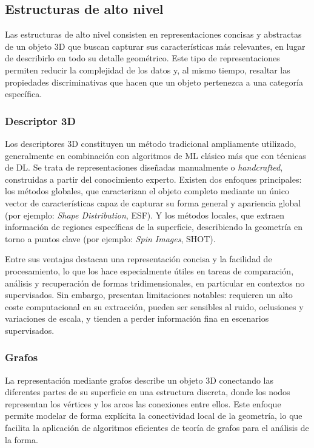 \subsection{Estructuras de alto nivel}
Las estructuras de alto nivel consisten en representaciones concisas y abstractas de un objeto 3D que buscan capturar sus características más relevantes, en lugar de describirlo en todo su detalle geométrico. Este tipo de representaciones permiten reducir la complejidad de los datos y, al mismo tiempo, resaltar las propiedades discriminativas que hacen que un objeto pertenezca a una categoría específica.

\subsubsection{Descriptor 3D}
Los descriptores 3D constituyen un método tradicional ampliamente utilizado, generalmente en combinación con algoritmos de ML clásico más que con técnicas de DL. Se trata de representaciones diseñadas manualmente o \textit{handcrafted}, construidas a partir del conocimiento experto. Existen dos enfoques principales: los métodos globales, que caracterizan el objeto completo mediante un único vector de características capaz de capturar su forma general y apariencia global (por ejemplo: \textit{Shape Distribution}, ESF). Y los métodos locales, que extraen información de regiones específicas de la superficie, describiendo la geometría en torno a puntos clave (por ejemplo: \textit{Spin Images}, SHOT).

Entre sus ventajas destacan una representación concisa y la facilidad de procesamiento, lo que los hace especialmente útiles en tareas de comparación, análisis y recuperación de formas tridimensionales, en particular en contextos no supervisados. Sin embargo, presentan limitaciones notables: requieren un alto coste computacional en su extracción, pueden ser sensibles al ruido, oclusiones y variaciones de escala, y tienden a perder información fina en escenarios supervisados.

\subsubsection{Grafos}
La representación mediante grafos describe un objeto 3D conectando las diferentes partes de su superficie en una estructura discreta, donde los nodos representan los vértices y los arcos las conexiones entre ellos. Este enfoque permite modelar de forma explícita la conectividad local de la geometría, lo que facilita la aplicación de algoritmos eficientes de teoría de grafos para el análisis de la forma.

